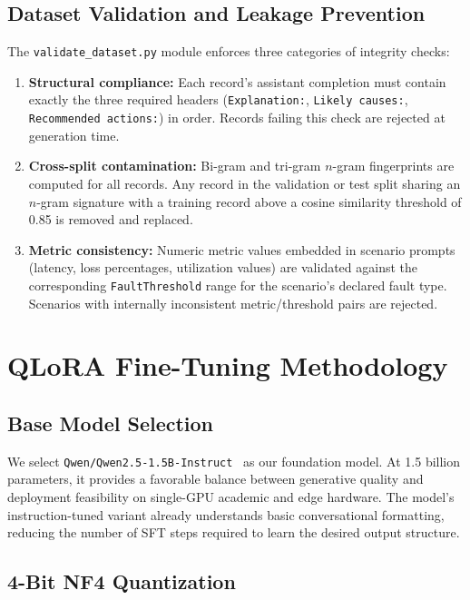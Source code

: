 \documentclass[conference]{IEEEtran}
\begin{document}
\subsection{Dataset Validation and Leakage Prevention}

The \texttt{validate\_dataset.py} module enforces three categories of integrity checks:

\begin{enumerate}
    \item \textbf{Structural compliance:} Each record's assistant completion must contain exactly the three required headers (\texttt{Explanation:}, \texttt{Likely causes:}, \texttt{Recommended actions:}) in order. Records failing this check are rejected at generation time.
    \item \textbf{Cross-split contamination:} Bi-gram and tri-gram $n$-gram fingerprints are computed for all records. Any record in the validation or test split sharing an $n$-gram signature with a training record above a cosine similarity threshold of 0.85 is removed and replaced.
    \item \textbf{Metric consistency:} Numeric metric values embedded in scenario prompts (latency, loss percentages, utilization values) are validated against the corresponding \texttt{FaultThreshold} range for the scenario's declared fault type. Scenarios with internally inconsistent metric/threshold pairs are rejected.
\end{enumerate}

\section{QLoRA Fine-Tuning Methodology}
\label{sec:qlora}

\subsection{Base Model Selection}

We select \texttt{Qwen/Qwen2.5-1.5B-Instruct}~\cite{qwen25} as our foundation model. At 1.5 billion parameters, it provides a favorable balance between generative quality and deployment feasibility on single-GPU academic and edge hardware. The model's instruction-tuned variant already understands basic conversational formatting, reducing the number of SFT steps required to learn the desired output structure.

\subsection{4-Bit NF4 Quantization}
\end{document}
